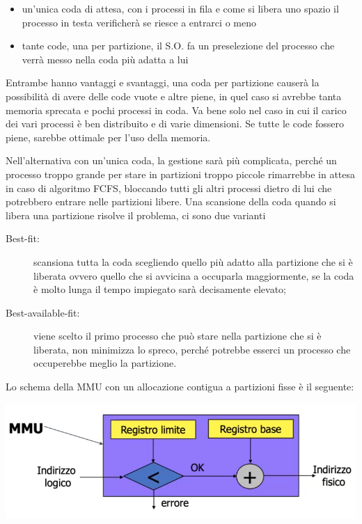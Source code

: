 \documentclass[a4paper, 12pt]{book}
\begin{document}
    \begin{itemize}
        \item un'unica coda di attesa, con i processi in fila e come si libera uno spazio il processo in testa verificherà
        se riesce a entrarci o meno
        \item tante code, una per partizione, il S.O. fa un preselezione del processo che verrà messo nella coda più adatta a lui
    \end{itemize}

    Entrambe hanno vantaggi e svantaggi, una coda per partizione causerà la possibilità di avere delle code vuote e altre piene, 
    in quel caso si avrebbe tanta memoria sprecata e pochi processi in coda. Va bene solo nel caso in cui il carico dei vari processi
    è ben distribuito e di varie dimensioni. Se tutte le code fossero piene, sarebbe ottimale per l'uso della memoria.

    Nell'alternativa con un'unica coda, la gestione sarà più complicata, perché un processo troppo grande per stare in partizioni
    troppo piccole rimarrebbe in attesa in caso di algoritmo FCFS, bloccando tutti gli altri processi dietro di lui che 
    potrebbero entrare nelle partizioni libere. Una scansione della coda quando si libera una partizione risolve il problema, ci 
    sono due varianti
    
    \begin{description}
        \item[Best-fit:] scansiona tutta la coda scegliendo quello più adatto alla partizione che si è liberata
        ovvero quello che si avvicina a occuparla maggiormente, se la coda è molto lunga il tempo impiegato sarà decisamente
        elevato;
        \item[Best-available-fit:] viene scelto il primo processo che può stare nella partizione che si è liberata, non minimizza
        lo spreco, perché potrebbe esserci un processo che occuperebbe meglio la partizione.
    \end{description}

Lo schema della MMU con un allocazione contigua a partizioni fisse è il seguente:

\begin{center}
    \includegraphics[width=1\textwidth]{mmu_partizioni_fisse.png}
\end{center}
\end{document}
